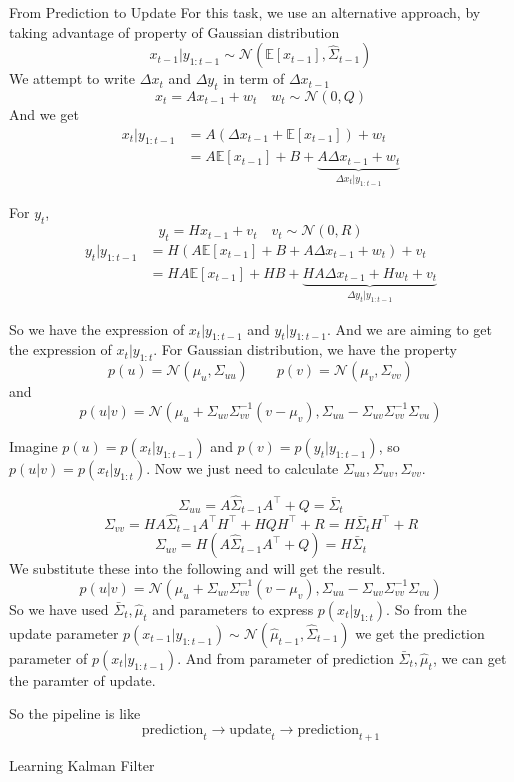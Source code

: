\documentclass{beamer}
\def\N{\mathcal{N}}
\def\E{\mathbb{E}}
\begin{document}
\begin{frame}[allowframebreaks]{From Prediction to Update}
For this task, we use an alternative approach, by taking advantage of property of Gaussian distribution
$$x_{t-1} | y_{1:t-1} \sim \N(\E[x_{t-1}], \hat{\Sigma}_{t-1})$$
We attempt to write $\Delta x_t$ and $\Delta y_t$ in term of $\Delta x_{t-1}$
$$x_t = Ax_{t-1} + w_t \quad w_t \sim \N(0, Q)$$
And we get 
\begin{align*}
x_t|y_{1:t-1} & = A(\Delta x_{t-1} + \E[x_{t-1}]) + w_t \\
& = A\E[x_{t-1}] + B + \underbrace{A\Delta x_{t-1} + w_t}_{\Delta x_t | y_{1:t-1}}
\end{align*}

\framebreak

For $y_t$,
$$y_t = Hx_{t-1} + v_t \quad v_t \sim \N(0, R)$$
\begin{align*}
y_t|y_{1:t-1} & = H(A\E[x_{t-1}] + B + A\Delta x_{t-1} + w_t) + v_t \\
& = HA\E[x_{t-1}] + HB + \underbrace{HA\Delta x_{t-1} + Hw_t + v_t}_{\Delta y_t | y_{1 : t-1}}
\end{align*}

So we have the expression of $x_t|y_{1:t-1}$ and $ y_t | y_{1 : t-1}$.
And we are aiming to get the expression of $x_t | y_{1:t}$.
For Gaussian distribution, we have the property
$$p(u) = \N(\mu_u, \Sigma_{uu}) \qquad p(v) = \N(\mu_v, \Sigma_{vv})$$
and 
$$p(u | v) = \N(\mu_u + \Sigma_{uv} \Sigma_{vv}^{-1}(v - \mu_v), \Sigma_{uu} - \Sigma_{uv}\Sigma_{vv}^{-1}\Sigma_{vu})$$

\framebreak 
Imagine $p(u) = p(x_t | y_{1 : t-1})$ and $p(v) = p(y_t | y_{1 : t-1})$, so $p(u |v) = p(x_t | y_{1:t})$.
Now we just need to calculate $\Sigma_{uu}, \Sigma_{uv}, \Sigma_{vv}$.

$$\Sigma_{uu} = A \hat{\Sigma}_{t-1} A^\top + Q = \bar{\Sigma}_t$$
$$\Sigma_{vv} = HA \hat{\Sigma}_{t-1}A^\top H^\top + HQ H^\top + R = H \bar{\Sigma}_t H^\top +R$$
$$\Sigma_{uv} = H(A\hat{\Sigma}_{t-1}A^\top + Q) = H\bar{\Sigma}_t$$
We substitute these into the following and will get the result.
$$p(u | v) = \N(\mu_u + \Sigma_{uv} \Sigma_{vv}^{-1}(v - \mu_v), \Sigma_{uu} - \Sigma_{uv}\Sigma_{vv}^{-1}\Sigma_{vu})$$
So we have used $\bar{\Sigma}_t, \hat{\mu}_t$ and parameters to express $p(x_t | y_{1:t})$.
So from the update parameter $p(x_{t-1} | y_{1:t-1}) \sim \N(\hat{\mu}_{t-1}, \hat{\Sigma}_{t-1})$ we get the prediction parameter of $p(x_t | y_{1:t-1})$. And from parameter of prediction $\bar{\Sigma}_t, \hat{\mu}_t$, we can get the paramter of update.

\framebreak 

So the pipeline is like 
$$\text{prediction}_t \longrightarrow \text{update}_t \longrightarrow \text{prediction}_{t+1}$$

\end{frame}

\begin{frame}[allowframebreaks]{Learning Kalman Filter}


\end{frame}
\end{document}
